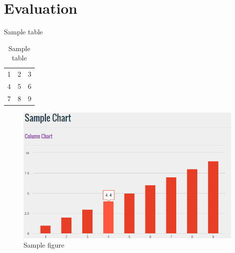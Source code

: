 \section{Evaluation}
Sample table \\
\begin{table}[!ht]
    \centering
    \begin{tabular}{ l c r }
      1 & 2 & 3 \\
      4 & 5 & 6 \\
      7 & 8 & 9 \\
    \end{tabular}
    \caption{Sample table}
    \label{tab:table1}
\end{table}

\begin{figure}[ht]
    \centering
    \includegraphics[width=1.0\textwidth]{sample.png}
    \caption{Sample figure}
\end{figure}